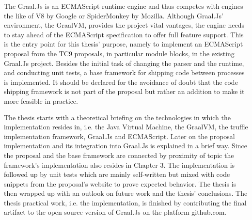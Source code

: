 The Graal.Js is an ECMAScript runtime engine and thus competes with engines the like of V8 by Google or SpiderMonkey by Mozilla. Although Graal.Js' environment, the GraalVM, provides the project vital vantages, the engine needs to stay ahead of the ECMAScript specification to offer full feature support. This is the entry point for this thesis' purpose, namely to implement an ECMAScript proposal from the TC9 proposals, in particular module blocks, in the existing Graal.Js project. Besides the initial task of changing the parser and the runtime, and conducting unit tests, a base framework for shipping code between processes is implemented.  It should be declared for the avoidance of doubt that the code shipping framework is not part of the proposal but rather an addition to make it more feasible in practice.

The thesis starts with a theoretical briefing on the technologies in which the implementation resides in, i.e. the Java Virtual Machine, the GraalVM, the truffle implementation framework, Graal.Js and ECMAScript. Later on the proposal implementation and its integration into Graal.Js is explained in a brief way. Since the proposal and the base framework are connected by proximity of topic the framework's implementation also resides in Chapter 3. The implementation is followed up by unit tests which are mainly self-written but mixed with code snippets from the proposal's website to prove expected behavior. The thesis is then wrapped up with an outlook on future work and the thesis' conclusions. The thesis practical work, i.e. the implementation, is finished by contributing the final artifact to the open source version of Graal.Js on the platform github.com.


